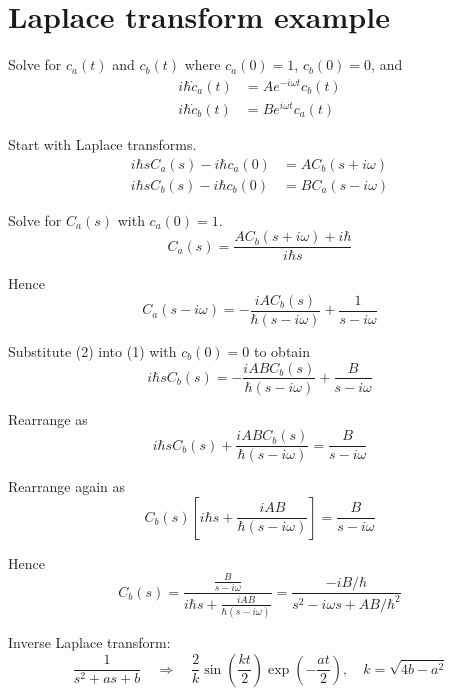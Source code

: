 

\section*{Laplace transform example}

Solve for $c_a(t)$ and $c_b(t)$ where $c_a(0)=1$, $c_b(0)=0$, and
\begin{align*}
i\hbar\dot c_a(t)&=Ae^{-i\omega t}c_b(t)
\\
i\hbar\dot c_b(t)&=Be^{i\omega t}c_a(t)
\end{align*}

Start with Laplace transforms.
\begin{align*}
i\hbar sC_a(s)-i\hbar c_a(0)&=AC_b(s+i\omega)
\\
i\hbar sC_b(s)-i\hbar c_b(0)&=BC_a(s-i\omega)
\tag{1}
\end{align*}

Solve for $C_a(s)$ with $c_a(0)=1$.
\begin{equation*}
C_a(s)=\frac{AC_b(s+i\omega)+i\hbar}{i\hbar s}
\end{equation*}

Hence
\begin{equation*}
C_a(s-i\omega)=-\frac{iAC_b(s)}{\hbar(s-i\omega)}+\frac{1}{s-i\omega}
\tag{2}
\end{equation*}

Substitute (2) into (1) with $c_b(0)=0$ to obtain
\begin{equation*}
i\hbar sC_b(s)=-\frac{iABC_b(s)}{\hbar(s-i\omega)}+\frac{B}{s-i\omega}
\end{equation*}

Rearrange as
\begin{equation*}
i\hbar sC_b(s)+\frac{iABC_b(s)}{\hbar(s-i\omega)}=\frac{B}{s-i\omega}
\end{equation*}

Rearrange again as
\begin{equation*}
C_b(s)\left[i\hbar s+\frac{iAB}{\hbar(s-i\omega)}\right]=\frac{B}{s-i\omega}
\end{equation*}

Hence
\begin{equation*}
C_b(s)=\frac
{\displaystyle\frac{B}{s-i\omega}}
{\displaystyle i\hbar s+\frac{iAB}{\hbar(s-i\omega)}}
=\frac{-iB/\hbar}{s^2-i\omega s+AB/\hbar^2}
\end{equation*}

Inverse Laplace transform:
\begin{equation*}
\frac{1}{s^2+as+b}\quad\Rightarrow\quad
\frac{2}{k}\sin\left(\frac{kt}{2}\right)\exp\left(-\frac{at}{2}\right),\quad
k=\sqrt{4b-a^2}
\end{equation*}

